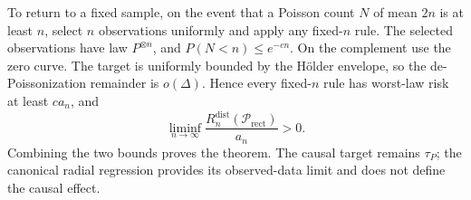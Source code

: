 To return to a fixed sample, on the event that a Poisson count \(N\) of mean \(2n\) is at least \(n\), select \(n\) observations uniformly and apply any fixed-\(n\) rule.  The selected observations have law \(P^{\otimes n}\), and \(P(N<n)\leq e^{-cn}\).  On the complement use the zero curve.  The target is uniformly bounded by the H\"older envelope, so the de-Poissonization remainder is \(o(\Delta)\).  Hence every fixed-\(n\) rule has worst-law risk at least \(ca_n\), and
\[
 \liminf_{n\to\infty}\frac{R_n^{\mathrm{dist}}(\mathcal P_{\mathrm{rect}})}{a_n}>0.
\]
Combining the two bounds proves the theorem.  The causal target remains \(\tau_P\); the canonical radial regression provides its observed-data limit and does not define the causal effect.